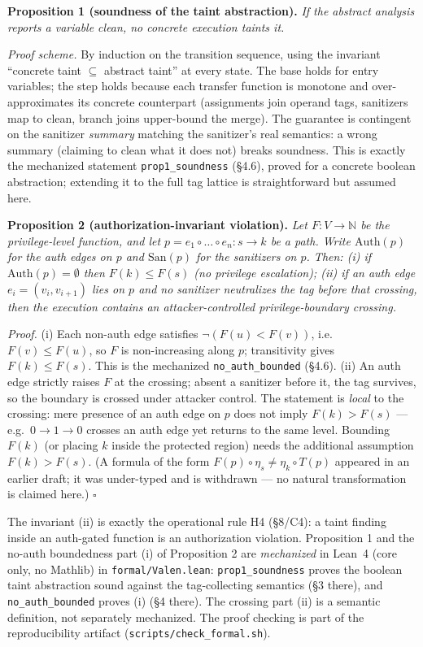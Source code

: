 \documentclass[11pt]{article}
\begin{document}
\smallskip
\noindent\textbf{Proposition 1 (soundness of the taint abstraction).} \emph{If the
abstract analysis reports a variable clean, no concrete execution taints it.}

\noindent\emph{Proof scheme.} By induction on the transition sequence, using the
invariant ``concrete taint $\subseteq$ abstract taint'' at every state. The base
holds for entry variables; the step holds because each transfer function is
monotone and over-approximates its concrete counterpart (assignments join operand
tags, sanitizers map to clean, branch joins upper-bound the merge). The guarantee
is contingent on the sanitizer \emph{summary} matching the sanitizer's real
semantics: a wrong summary (claiming to clean what it does not) breaks soundness.
This is exactly the mechanized statement \texttt{prop1\_soundness} (\S4.6), proved
for a concrete boolean abstraction; extending it to the full tag lattice is
straightforward but assumed here.

\smallskip
\noindent\textbf{Proposition 2 (authorization-invariant violation).} \emph{Let
$F : V \to \mathbb{N}$ be the privilege-level function, and let
$p = e_1 \circ \dots \circ e_n : s \to k$ be a path. Write $\mathrm{Auth}(p)$ for
the auth edges on $p$ and $\mathrm{San}(p)$ for the sanitizers on $p$. Then:
(i) if $\mathrm{Auth}(p) = \emptyset$ then $F(k) \le F(s)$ (no privilege
escalation); (ii) if an auth edge $e_i = (v_i, v_{i+1})$ lies on $p$ and no
sanitizer neutralizes the tag before that crossing, then the execution contains an
attacker-controlled privilege-boundary crossing.}

\noindent\emph{Proof.} (i) Each non-auth edge satisfies $\neg(F(u) < F(v))$, i.e.\
$F(v) \le F(u)$, so $F$ is non-increasing along $p$; transitivity gives
$F(k) \le F(s)$. This is the mechanized \texttt{no\_auth\_bounded} (\S4.6). (ii) An
auth edge strictly raises $F$ at the crossing; absent a sanitizer before it, the
tag survives, so the boundary is crossed under attacker control. The statement is
\emph{local} to the crossing: mere presence of an auth edge on $p$ does not imply
$F(k) > F(s)$ --- e.g.\ $0 \to 1 \to 0$ crosses an auth edge yet returns to the
same level. Bounding $F(k)$ (or placing $k$ inside the protected region) needs the
additional assumption $F(k) > F(s)$. (A formula of the
form $F(p)\circ\eta_s \neq \eta_k\circ T(p)$ appeared in an
earlier draft; it was under-typed and is withdrawn --- no natural transformation is
claimed here.) $\square$

\noindent The invariant (ii) is exactly the operational rule H4 (§8/C4): a taint
finding inside an auth-gated function is an authorization violation. Proposition 1
and the no-auth boundedness part (i) of Proposition 2 are \emph{mechanized} in
Lean~4 (core only, no Mathlib) in \texttt{formal/Valen.lean}:
\texttt{prop1\_soundness} proves the boolean taint abstraction sound against the
tag-collecting semantics (\S3 there), and \texttt{no\_auth\_bounded} proves (i)
(\S4 there). The crossing part (ii) is a semantic definition, not separately
mechanized. The proof checking is part of the reproducibility artifact
(\texttt{scripts/check\_formal.sh}).
\end{document}

